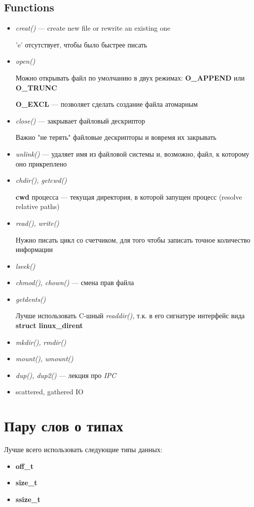 \documentclass[../../lectures.tex]{subfiles}
\begin{document}
\subsection{Functions}
\begin{itemize}
    \item \emph{creat()} --- create new file or rewrite an existing one

          'e' отсутствует, чтобы было быстрее писать
    \item \emph{open()}

          Можно открывать файл по умолчанию в двух режимах: 
          \textbf{O\_APPEND} или \textbf{O\_TRUNC}

          \textbf{O\_EXCL} --- позволяет сделать создание файла атомарным
    \item \emph{close()} --- закрывает файловый дескриптор

          Важно "не терять" файловые дескрипторы и вовремя их закрывать
    \item \emph{unlink()} --- удаляет имя из файловой системы и, возможно, файл, к которому оно прикреплено
    \item \emph{chdir(), getcwd()}

          \textbf{cwd} процесса --- текущая директория, в которой запущен процесс (resolve relative paths)
    \item \emph{read(), write()}

          Нужно писать цикл со счетчиком, для того чтобы записать точное количество информации
    \item \emph{lseek()}
    \item \emph{chmod(), chown()} --- смена прав файла
    \item \emph{getdents()}

        Лучше использовать C-шный \emph{readdir()}, т.к. в его сигнатуре интерфейс вида 
        \textbf{struct linux\_dirent}
    \item \emph{mkdir(), rmdir()}
    \item \emph{mount(), umount()}
    \item \emph{dup(), dup2()} --- лекция про \emph{IPC}
    \item scattered, gathered IO

\end{itemize}

\section{Пару слов о типах}
Лучше всего использовать следующие типы данных:
\begin{itemize}
    \item \textbf{off\_t}
    \item \textbf{size\_t}
    \item \textbf{ssize\_t}
\end{itemize}
\end{document}
